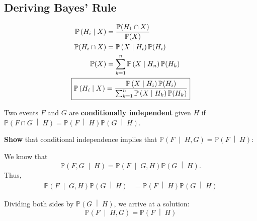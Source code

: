 \documentclass[titlepage, 12pt, leqno]{article}
\begin{document}
\subsection{Deriving Bayes' Rule}
\begin{align*}
    \mathbb{P}\left(H_i \;\middle|\; X\right) &= \frac{\mathbb{P}(
    H_1 \cap X)}{\mathbb{P}(X)} \\ \mathbb{P}(H_i \cap X) &= \mathbb{P}\left(X \;\middle|\; H_i\right) 
    \mathbb{P}(H_i) \\
        \mathbb{P}(X) &= \sum_{k=1}^{n} \mathbb{P}\left(X \;\middle|\; H_n\right) 
    \mathbb{P}(H_k) \\
        \Aboxed{ \mathbb{P}\left(H_i \;\middle|\; X\right) &= \frac{
    \mathbb{P}\left(X \;\middle|\; H_i\right) \mathbb{P}(H_i)}{
    \sum_{k=1}^{n} \mathbb{P}\left(X \;\middle|\; H_k\right) \mathbb{P}(H_k)}}
\end{align*}

\begin{definition}
    Two events $F$ and $G$ are \textbf{conditionally independent} given $H$ if
    $ \mathbb{P}\left(F \cap G \;\middle|\; H\right) = 
    \mathbb{P}\left(F \;\middle|\; H\right) \mathbb{P}\left(G \;\middle|\; 
    H\right) $.
\end{definition}

\pagebreak

\begin{ex}
    \textbf{Show} that conditional independence implies that
    $ \mathbb{P}\left(F \;\middle|\; H,G\right) = \mathbb{P}\left(F \;\middle|\; 
    H\right) $:

    \vspace{10px}
    We know that 
    \[
         \mathbb{P}\left(F,G \;\middle|\; H\right) = 
        \mathbb{P}\left(F \;\middle|\; G,H\right) \mathbb{P}\left(G \;\middle|\; 
        H\right).
    \]
    Thus,
    \begin{align*}
        \mathbb{P}\left(F \;\middle|\; G,H\right) \mathbb{P}\left(G \;\middle|\; 
        H\right) &= \mathbb{P}\left(F \;\middle|\; H\right) \mathbb{P}\left(
        G\;\middle|\; H\right) 
    \end{align*}
    
    Dividing both sides by $ \mathbb{P}\left(G \;\middle|\; H\right) $, we
    arrive at a solution:
    \[
        \boxed{ \mathbb{P}\left(F \;\middle|\; H,G\right) = 
        \mathbb{P}\left(F \;\middle|\; H\right) } 
    \]
\end{ex}
\end{document}
